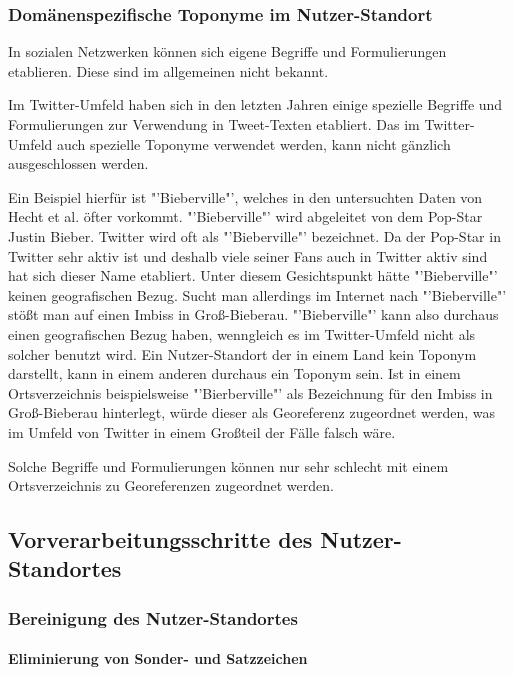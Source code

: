 			\subsubsection{Domänenspezifische Toponyme im Nutzer-Standort} 

				In sozialen Netzwerken können sich eigene Begriffe und Formulierungen etablieren. 
				Diese sind im allgemeinen nicht bekannt.

				Im Twitter-Umfeld haben sich in den letzten Jahren einige spezielle Begriffe und Formulierungen zur Verwendung in Tweet-Texten etabliert. 
				Das im Twitter-Umfeld auch spezielle Toponyme verwendet werden, kann nicht gänzlich ausgeschlossen werden. 

				Ein Beispiel hierfür ist "'Bieberville"', welches in den untersuchten Daten von Hecht et al. öfter vorkommt.
				"'Bieberville"' wird abgeleitet von dem Pop-Star Justin Bieber.	
				Twitter wird oft als "'Bieberville"' bezeichnet.
				Da der Pop-Star in Twitter sehr aktiv ist und deshalb viele seiner Fans auch in Twitter aktiv sind hat sich dieser Name etabliert.
				Unter diesem Gesichtspunkt hätte "'Bieberville"' keinen geografischen Bezug.
				Sucht man allerdings im Internet nach "'Bieberville"' stößt man auf einen Imbiss in Groß-Bieberau.
				"'Bieberville"' kann also durchaus einen geografischen Bezug haben, wenngleich es im Twitter-Umfeld nicht als solcher benutzt wird. 
				Ein Nutzer-Standort der in einem Land kein Toponym darstellt, kann in einem anderen durchaus ein Toponym sein.
				Ist in einem Ortsverzeichnis beispielsweise "'Bierberville"' als Bezeichnung für den Imbiss in Groß-Bieberau hinterlegt, würde dieser als Georeferenz zugeordnet werden, was im Umfeld von Twitter in einem Großteil der Fälle falsch wäre.

				Solche Begriffe und Formulierungen können nur sehr schlecht mit einem Ortsverzeichnis zu Georeferenzen zugeordnet werden. 

		\subsection{Vorverarbeitungsschritte des Nutzer-Standortes}

			\subsubsection{Bereinigung des Nutzer-Standortes}

				\paragraph{Eliminierung von Sonder- und Satzzeichen} 

